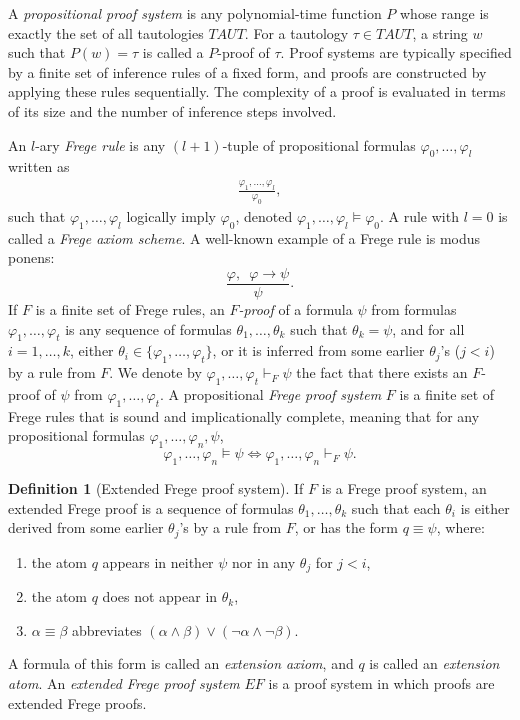 \documentclass{article}
\theoremstyle{definition}
\newtheorem{df}{Definition}
\theoremstyle{theorem}
\theoremstyle{theorem}
\theoremstyle{remark}
\theoremstyle{remark}
\theoremstyle{example}
\theoremstyle{notation}
\theoremstyle{theorem}
\begin{document}
A \emph{propositional proof system} is any polynomial-time function $P$ whose range is exactly the set of all tautologies $TAUT$. For a tautology $\tau\in TAUT$, a string $w$ such that $P(w)=\tau$ is called a $P$-proof of $\tau$. Proof systems are typically specified by a finite set of inference rules of a fixed form, and proofs are constructed by applying these rules sequentially. The complexity of a proof is evaluated in terms of its size and the number of inference steps involved.

An $l$-ary \emph{Frege rule} is any $(l+1)$-tuple of propositional formulas $\varphi_0, \ldots, \varphi_l$ written as
\begin{gather*}
    \frac{\varphi_1, \ldots, \varphi_l}{\varphi_0},
\end{gather*}
such that $\varphi_1, \ldots, \varphi_l$ logically imply $\varphi_0$, denoted $\varphi_1, \ldots, \varphi_l \vDash \varphi_0$. A rule with $l = 0$ is called a \emph{Frege axiom scheme}. A well-known example of a Frege rule is modus ponens:
$$
\frac{\varphi, \,\,\, \varphi \to \psi}{\psi}.
$$
If $F$ is a finite set of Frege rules, an \emph{$F$-proof} of a formula $\psi$ from formulas $\varphi_1, \ldots, \varphi_t$ is any sequence of formulas $\theta_1, \ldots, \theta_k$ such that $\theta_k = \psi$, and for all $i = 1, \ldots, k$, either $\theta_i \in \{\varphi_1, \ldots, \varphi_t\}$, or it is inferred from some earlier $\theta_j$'s ($j < i$) by a rule from $F$. We denote by $\varphi_1, \ldots, \varphi_t \vdash_F \psi$ the fact that there exists an $F$-proof of $\psi$ from $\varphi_1, \ldots, \varphi_t$. A propositional \emph{Frege proof system} $F$ is a finite set of Frege rules that is sound and implicationally complete, meaning that for any propositional formulas $\varphi_1, \ldots, \varphi_n, \psi$,
$$
\varphi_1, \ldots, \varphi_n \vDash \psi \iff \varphi_1, \ldots, \varphi_n \vdash_F \psi.
$$

\begin{df}[Extended Frege proof system] 
If $F$ is a Frege proof system, an extended Frege proof is a sequence of formulas $\theta_1, \ldots, \theta_k$ such that each $\theta_i$ is either derived from some earlier $\theta_j$'s by a rule from $F$, or has the form $q \equiv \psi$, where:
\begin{enumerate}
    \item the atom $q$ appears in neither $\psi$ nor in any $\theta_j$ for $j < i$,
    \item the atom $q$ does not appear in $\theta_k$,
    \item $\alpha \equiv \beta$ abbreviates $(\alpha \wedge \beta) \vee (\neg \alpha \wedge \neg \beta)$.
\end{enumerate}
A formula of this form is called an \emph{extension axiom}, and $q$ is called an \emph{extension atom}. An \emph{extended Frege proof system} $EF$ is a proof system in which proofs are extended Frege proofs. 
\end{df}
\end{document}
